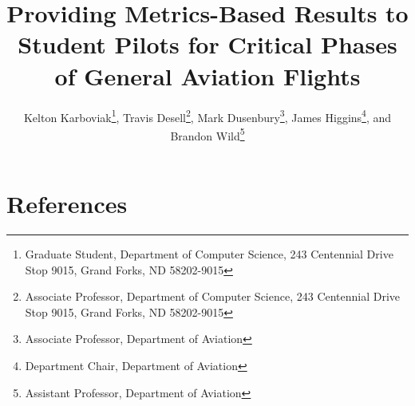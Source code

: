 \documentclass{AIAA}
\begin{document}
\title{Providing Metrics-Based Results to Student Pilots for Critical Phases of General Aviation Flights}

\author{
	Kelton Karboviak\footnote{Graduate Student, Department of Computer Science, 243 Centennial Drive Stop 9015, Grand Forks, ND 58202-9015},
	Travis Desell\footnote{Associate Professor, Department of Computer Science, 243 Centennial Drive Stop 9015, Grand Forks, ND 58202-9015},
	Mark Dusenbury\footnote{Associate Professor, Department of Aviation},
	James Higgins\footnote{Department Chair, Department of Aviation}, and
	Brandon Wild\footnote{Assistant Professor, Department of Aviation}
}



\begin{abstract}
    
\end{abstract}


\maketitle












\section*{References}


\end{document}
